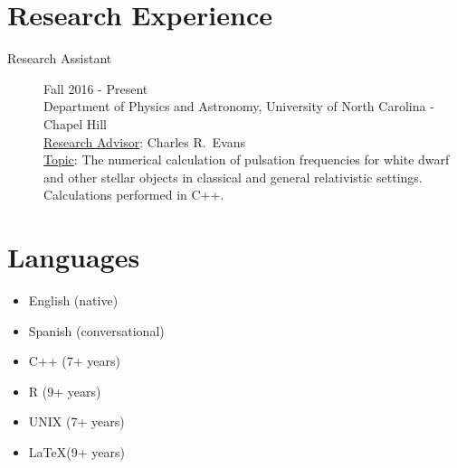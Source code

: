\documentclass[11pt]{article}
\begin{document}
\section*{Research Experience}
\begin{minipage}{\textwidth}
	\begin{description}
		\item[Research Assistant] Fall 2016 - Present\\
		Department of Physics and Astronomy, University of North Carolina - Chapel Hill\\
		\underline{Research Advisor}: Charles R.~Evans\\
		\underline{Topic}: The numerical calculation of pulsation frequencies for white dwarf and other stellar objects in classical and general relativistic settings.  Calculations performed in C++.
	\end{description}
\end{minipage}

\section*{Languages}
\begin{minipage}{\columnwidth}
\begin{multicols}{3}
	\begin{itemize}
		\item English (native)
		\item Spanish (conversational)
		\item C++ (7+ years)
		\item R (9+ years)
		\item UNIX (7+ years)
		\item \LaTeX (9+ years)
	\end{itemize}
\end{multicols}
\end{minipage}
\end{document}
